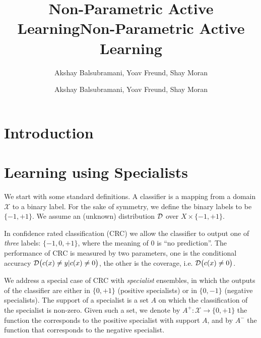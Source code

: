 \documentclass{article}
\title{Non-Parametric Active Learning}
\author{Akshay Balsubramani, Yoav Freund, Shay Moran}
\title{Non-Parametric Active Learning}
\author{Akshay Balsubramani, Yoav Freund, Shay Moran}
\newcommand{\D}{{\cal D}}
\newcommand{\cX}{\mathcal{X}}
\newcommand{\new}[1]{\textcolor{red}{#1}}
\newcommand{\comment}[3]{\marginpar{\textcolor{#2}{#1: #3}}}
\newcommand{\shay}[1]{\comment{Shay}{red}{#1}}
\begin{document}
\maketitle
\section{Introduction}
\iffalse
\shay{Was the Muffler ever used in the literature of Active Learning? }
In this paper we suggest a different approach to the problem of active
learning using balls. \new{Instead of using the min/max solution given by
Muffler}, we consider an Occam's razor approach by which we make the
simplest prediction possible given the constraints.
\fi

\section{Learning using Specialists}

We start with some standard definitions. A classifier is a
mapping from a domain $\cX$ to a binary label. For the sake of symmetry,
we define the binary labels to be $\{-1,+1\}$. 
We assume an (unknown) distribution $\D$ over $X \times \{-1,+1\}$.

In confidence rated classification (CRC) we allow the classifier to
output one of {\em three} labels: $\{-1,0,+1\}$, where the meaning of
$0$ is ``no prediction''. The performance of CRC is measured by two
parameters, one is the conditional accuracy $\D\bigl(c(x) \neq y | c(x) \neq
0\bigr)$, the other is the coverage, i.e. $\D\bigl(c(x) \neq 0\bigr)$.

We address a special case of CRC with {\em specialist} ensembles, 
in which the outputs of the classifier are either in $\{0,+1\}$ (positive specialists) or in
$\{0,-1\}$ (negative specialists). 
The support of a specialist is a set $A$ on which the classification of
the specialist is non-zero. Given such a set, we denote by $A^+: \cX \to \{0,+1\}$ the
function the corresponds to the positive specialist with support $A$, and by $A^-$ the
function that corresponds to the negative specialist.
\end{document}
